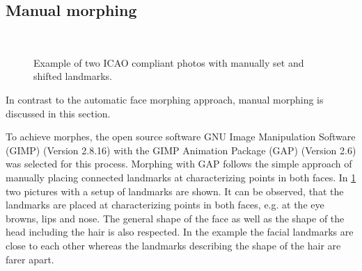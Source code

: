 \subsection{Manual morphing}
\label{manual_morph}
\begin{figure}[h]
	\centering
	\label{subfig:manualmorph01}\hspace{10pt}
	\label{subfig:manualmorph02}\\
	\caption{Example of two ICAO compliant photos with manually set and shifted landmarks.}
	\label{fig:manual_morph} 
\end{figure}
In contrast to the automatic face morphing approach, manual morphing is discussed in this section. 

To achieve morphes, the open source software GNU Image Manipulation Software (GIMP) (Version 2.8.16) with the GIMP Animation Package (GAP) (Version 2.6) was selected for this process. Morphing with GAP follows the simple approach of manually placing connected landmarks at characterizing points in both faces. In \ref{fig:manual_morph} two pictures with a setup of landmarks are shown. It can be observed, that the landmarks are placed at characterizing points in both faces, e.g. at the eye browns, lips and nose. The general shape of the face as well as the shape of the head including the hair is also respected. In the example the facial landmarks are close to each other whereas the landmarks describing the shape of the hair are farer apart. 

